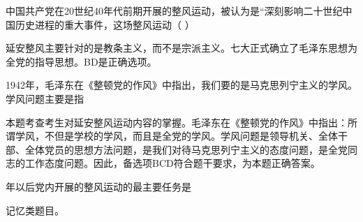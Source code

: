 \question 中国共产党在20世纪40年代前期开展的整风运动，被认为是``深刻影响二十世纪中国历史进程的重大事件，这场整风运动（
）
\par{}
\begin{solution}延安整风主要针对的是教条主义，而不是宗派主义。七大正式确立了毛泽东思想为全党的指导思想。BD是正确选项。
\end{solution}
\question 1942年，毛泽东在《整顿党的作风》中指出，我们要的是马克思列宁主义的学风。学风问题主要是指
\par{}
\begin{solution}本题考查考生对延安整风运动内容的掌握。毛泽东在《整顿党的作风》中指出：所谓学风，不但是学校的学风，而且是全党的学风。学风问题是领导机关、全体干部、全体党员的思想方法问题，是我们对待马克思列宁主义的态度问题，是全党同志的工作态度问题。因此，备选项BCD符合题干要求，为本题正确答案。
\end{solution}
 年以后党内开展的整风运动的最主要任务是
\par{}
\begin{solution}记忆类题目。
\end{solution}
